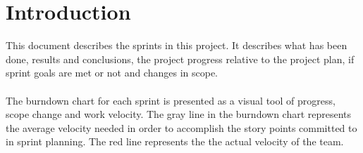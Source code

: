 \section*{Introduction}

This document describes the sprints in this project. It describes what has been done, results and conclusions, the project progress relative to the project plan, if sprint goals are met or not and changes in scope.
\\\\
The burndown chart for each sprint is presented as a visual tool of progress, scope change and work velocity. The gray line in the burndown chart represents the average velocity needed in order to accomplish the story points committed to in sprint planning. The red line represents the the actual velocity of the team.
